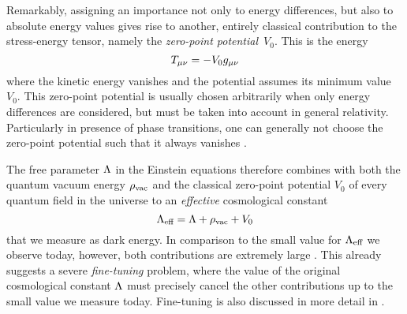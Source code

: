 Remarkably, assigning an importance not only to energy differences, but also to absolute energy values gives rise to another, entirely classical contribution to the stress-energy tensor, namely the \emph{zero-point potential}~\(V_0\). This is the energy
\begin{equation}
	T_{\mu\nu} = - V_0 g_{\mu\nu}
\end{equation}
where the kinetic energy vanishes and the potential assumes its minimum value~\(V_0\). This zero-point potential is usually chosen arbitrarily when only energy differences are considered, but must be taken into account in general relativity. Particularly in presence of phase transitions, one can generally not choose the zero-point potential such that it always vanishes \autocite{Martin2012}.

The free parameter \(\Lambda\) in the Einstein equations therefore combines with both the quantum vacuum energy \(\rho_\textnormal{vac}\) and the classical zero-point potential \(V_0\) of every quantum field in the universe to an \emph{effective} cosmological constant
\begin{equation}
	\Lambda_\textnormal{eff} = \Lambda + \rho_\textnormal{vac} + V_0
\end{equation}
that we measure as dark energy. In comparison to the small value for \(\Lambda_\textnormal{eff}\) we observe today, however, both contributions are extremely large \autocite{Martin2012}. This already suggests a severe \emph{fine-tuning} problem, where the value of the original cosmological constant \(\Lambda\) must precisely cancel the other contributions up to the small value we measure today. Fine-tuning is also discussed in more detail in .

